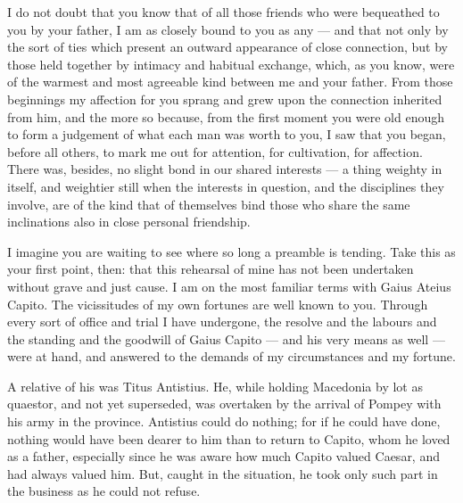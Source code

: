 

 I do not doubt that you know that of all those friends who were bequeathed to you by your father, I am as closely bound to you as any --- and that not only by the sort of ties which present an outward appearance of close connection, but by those held together by intimacy and habitual exchange, which, as you know, were of the warmest and most agreeable kind between me and your father. From those beginnings my affection for you sprang and grew upon the connection inherited from him, and the more so because, from the first moment you were old enough to form a judgement of what each man was worth to you, I saw that you began, before all others, to mark me out for attention, for cultivation, for affection. There was, besides, no slight bond in our shared interests --- a thing weighty in itself, and weightier still when the interests in question, and the disciplines they involve, are of the kind that of themselves bind those who share the same inclinations also in close personal friendship.

 I imagine you are waiting to see where so long a preamble is tending. Take this as your first point, then: that this rehearsal of mine has not been undertaken without grave and just cause. I am on the most familiar terms with Gaius Ateius Capito. The vicissitudes of my own fortunes are well known to you. Through every sort of office and trial I have undergone, the resolve and the labours and the standing and the goodwill of Gaius Capito --- and his very means as well --- were at hand, and answered to the demands of my circumstances and my fortune.

 A relative of his was Titus Antistius. He, while holding Macedonia by lot as quaestor, and not yet superseded, was overtaken by the arrival of Pompey with his army in the province. Antistius could do nothing; for if he could have done, nothing would have been dearer to him than to return to Capito, whom he loved as a father, especially since he was aware how much Capito valued Caesar, and had always valued him. But, caught in the situation, he took only such part in the business as he could not refuse.

